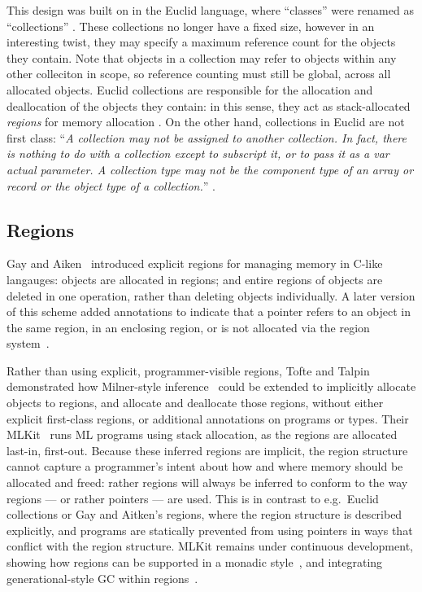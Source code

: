 This design was built on in the Euclid language, where ``classes''
were renamed as ``collections'' \cite{euclid1977}. These collections
no longer have a fixed size, however in an interesting twist, they may
specify a maximum reference count for the objects they contain. Note
that objects in a collection may refer to objects within any other
colleciton in scope, so reference counting must still be global,
across all allocated objects.  Euclid collections are responsible for
the allocation and deallocation of the objects they contain: in this
sense, they act as stack-allocated \textit{regions} for memory
allocation \cite{smallmemory}. On the other hand, 
collections in Euclid are not first class:
``\textit{A collection may not be assigned to another collection. In
fact, there is nothing to do with a collection except to subscript it, or to pass it as a var actual
parameter. A collection type may not be the component type of an array or record or the object
type of a collection.}''
\cite{euclid1977}.


\subsection{Regions}

Gay and Aiken~\cite{explicitRegions1998} introduced explicit
regions for managing memory in C-like langauges: objects are
allocated in regions; and entire regions of objects are deleted in
one operation, rather than deleting objects individually. A later
version of this scheme added annotations to indicate that a
pointer refers to an object in the same region, in an enclosing
region, or is not allocated via the region
system~\cite{gay-regions-pldi2001}.

Rather than using explicit, programmer-visible regions, Tofte and
Talpin~\cite{tofte_region-based_1997, tofte-retrospective-2004}
demonstrated how Milner-style inference~\cite{baker-unify1990}
could be extended to implicitly allocate objects to regions, and
allocate and deallocate those regions, without either explicit
first-class regions, or additional annotations on programs or
types. Their MLKit~\cite{mlkit-4.6.0} runs ML programs using stack
allocation, as the regions are allocated last-in, first-out.
Because these inferred regions are implicit, the region structure
cannot capture a programmer's intent about how and where memory
should be allocated and freed: rather regions will always be inferred
to conform to the way regions --- or rather pointers --- are used.
This is in contrast to e.g.\ Euclid collections 
or Gay and Aitken's regions, where the region structure is described
explicitly, and programs are statically prevented from using pointers
in ways that conflict with the region structure.
MLKit remains under continuous
development, showing how regions can be supported in a monadic
style~\cite{fluet-monadic-jfp2006}, and integrating
generational-style GC within
regions~\cite{elsman-generational-regions-jfp2021}.


